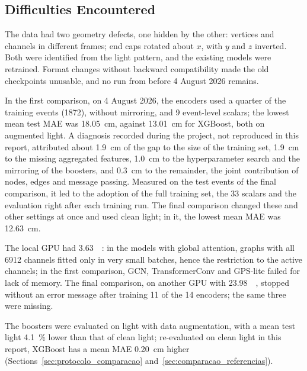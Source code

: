 \subsection{Difficulties Encountered}
\label{sec:dificuldades}

The data had two geometry defects, one hidden by the other: vertices and channels in different frames; end caps rotated about $x$, with $y$ and $z$ inverted. Both were identified from the light pattern, and the existing models were retrained. Format changes without backward compatibility made the old checkpoints unusable, and no run from before 4 August 2026 remains.

In the first comparison, on 4 August 2026, the encoders used a quarter of the training events (\num{1872}), without mirroring, and \num{9} event-level scalars; the lowest mean test MAE was \qty{18.05}{\cm}, against \qty{13.01}{\cm} for XGBoost, both on augmented light. A diagnosis recorded during the project, not reproduced in this report, attributed about \qty{1.9}{\cm} of the gap to the size of the training set, \qty{1.9}{\cm} to the missing aggregated features, \qty{1.0}{\cm} to the hyperparameter search and the mirroring of the boosters, and \qty{0.3}{\cm} to the remainder, the joint contribution of nodes, edges and message passing. Measured on the test events of the final comparison, it led to the adoption of the full training set, the \num{33} scalars and the evaluation right after each training run. The final comparison changed these and other settings at once and used clean light; in it, the lowest mean MAE was \qty{12.63}{\cm}.

The local GPU had \qty{3.63}{\gibi\byte}: in the models with global attention, graphs with all \num{6912} channels fitted only in very small batches, hence the restriction to the active channels; in the first comparison, GCN, TransformerConv and GPS-lite failed for lack of memory. The final comparison, on another GPU with \qty{23.98}{\gibi\byte}, stopped without an error message after training \num{11} of the \num{14} encoders; the same three were missing.

The boosters were evaluated on light with data augmentation, with a mean test light \qty{4.1}{\percent} lower than that of clean light; re-evaluated on clean light in this report, XGBoost has a mean MAE \qty{0.20}{\cm} higher (Sections~\ref{sec:protocolo_comparacao} and~\ref{sec:comparacao_referencias}).
